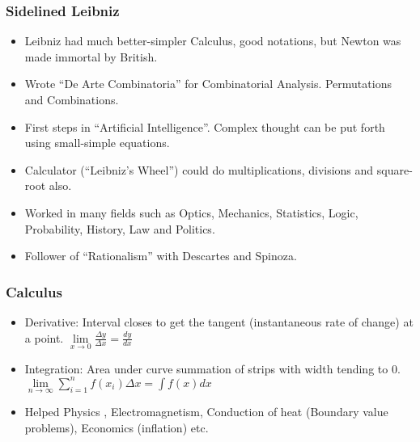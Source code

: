 \begin{frame}[fragile]
\frametitle{Sidelined Leibniz}
\begin{itemize}
\item Leibniz had much better-simpler Calculus, good notations, but Newton was made immortal by British.
\item Wrote ``De Arte Combinatoria'' for Combinatorial Analysis. Permutations and Combinations.
\item First steps in ``Artificial Intelligence''. Complex thought can be put forth using small-simple equations.
\item Calculator (``Leibniz's Wheel'') could do multiplications, divisions and square-root also.
\item Worked in many fields such as Optics, Mechanics, Statistics, Logic, Probability, History, Law and Politics.
\item Follower of ``Rationalism'' with Descartes and Spinoza.
\end{itemize}
\end{frame}

\begin{frame}[fragile]
\frametitle{Calculus}
\begin{itemize}
\item Derivative: Interval closes to get the tangent (instantaneous rate of change) at a point. $\lim \limits_{x \to 0} \frac{\Delta y}{\Delta x} = \frac{dy}{dx}$
\item Integration: Area under curve summation of strips with width tending to 0.
$\lim \limits_{n \to \infty} \sum^n_{i=1} f(x_i)\Delta x = \int f(x) dx$
\item Helped Physics , Electromagnetism, Conduction of heat (Boundary value problems), Economics (inflation) etc.
\end{itemize}
\end{frame}

